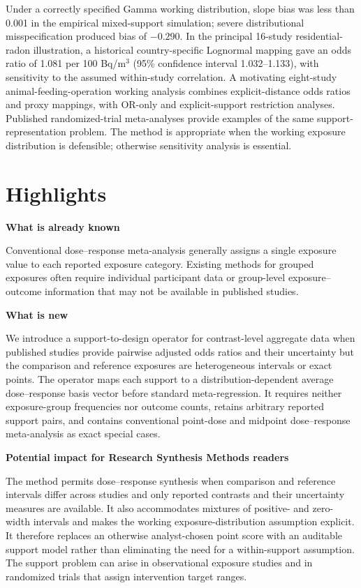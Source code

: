 \documentclass[journal=rsm]{CUP-JNL-DTM}%
\theoremstyle{definition}
\numberwithin{equation}{section}
\begin{document}
\begin{Frontmatter}
{Under a correctly specified Gamma working distribution, slope bias was less than 0.001 in the empirical mixed-support simulation; severe distributional misspecification produced bias of $-0.290$. In the principal 16-study residential-radon illustration, a historical country-specific Lognormal mapping gave an odds ratio of 1.081 per 100 Bq/m$^3$ (95\% confidence interval 1.032--1.133), with sensitivity to the assumed within-study correlation. A motivating eight-study animal-feeding-operation working analysis combines explicit-distance odds ratios and proxy mappings, with OR-only and explicit-support restriction analyses. Published randomized-trial meta-analyses provide examples of the same support-representation problem. The method is appropriate when the working exposure distribution is defensible; otherwise sensitivity analysis is essential.}

\end{Frontmatter}

\newpage
\section*{Highlights}

\noindent\textbf{What is already known}
\par
Conventional dose--response meta-analysis generally assigns a single exposure value to each reported exposure category. Existing methods for grouped exposures often require individual participant data or group-level exposure--outcome information that may not be available in published studies.

\noindent\textbf{What is new}
\par
We introduce a support-to-design operator for contrast-level aggregate data when published studies provide pairwise adjusted odds ratios and their uncertainty but the comparison and reference exposures are heterogeneous intervals or exact points. The operator maps each support to a distribution-dependent average dose--response basis vector before standard meta-regression. It requires neither exposure-group frequencies nor outcome counts, retains arbitrary reported support pairs, and contains conventional point-dose and midpoint dose--response meta-analysis as exact special cases.

\noindent\textbf{Potential impact for Research Synthesis Methods readers}
\par
The method permits dose--response synthesis when comparison and reference
intervals differ across studies and only reported contrasts and their
uncertainty measures are available. It also accommodates mixtures of positive-
and zero-width intervals and makes the working exposure-distribution assumption
explicit. It therefore replaces an otherwise analyst-chosen point score with
an auditable support model rather than eliminating the need for a within-support
assumption. The support problem can arise in observational exposure studies and
in randomized trials that assign intervention target ranges.
\end{document}
